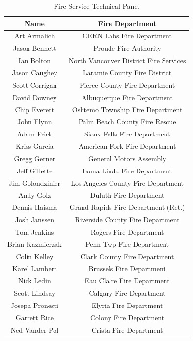 \documentclass{article}
\begin{document}
\begin{table}[H]
	\centering
	\caption{Fire Service Technical Panel}
	\begin{tabular}{|c|c|}
		\hline
		\bf{Name} & \bf{Fire Department} \\ \hline \hline
		Art Armalich & CERN Labs Fire Department \\ \hline
		Jason Bennett & Proude Fire Authority \\ \hline
		Ian Bolton & North Vancouver District Fire Services \\ \hline
		Jason Caughey & Laramie County Fire District \\ \hline
		Scott Corrigan & Pierce County Fire Department \\ \hline
		David Downey & Albuquerque Fire Department \\ \hline
		Chip Everett & Oshtemo Township Fire Department \\ \hline
		John Flynn & Palm Beach County Fire Rescue \\ \hline
		Adam Frick & Sioux Falls Fire Department \\ \hline
		Kriss Garcia & American Fork Fire Department \\ \hline
		Gregg Gerner & General Motors Assembly \\ \hline
		Jeff Gillette & Loma Linda Fire Department \\ \hline
		Jim Golondzinier & Los Angeles County Fire Department \\ \hline
		Andy Golz & Duluth Fire Department \\ \hline
		Dennis Haisma & Grand Rapids Fire Department (Ret.) \\ \hline
		Josh Janssen & Riverside County Fire Department \\ \hline
		Tom Jenkins & Rogers Fire Department \\ \hline
		Brian Kazmierzak & Penn Twp Fire Department \\ \hline
		Colin Kelley & Clark County Fire Department \\ \hline
		Karel Lambert & Brussels Fire Department \\ \hline
		Nick Ledin & Eau Claire Fire Department \\ \hline
		Scott Lindsay & Calgary Fire Department \\ \hline
		Joseph Pronesti & Elyria Fire Department \\ \hline
		Garrett Rice & Colony Fire Department \\ \hline
		Ned Vander Pol & Crista Fire Department \\ \hline
	\end{tabular}
	\label{tab:TechPanelList}
\end{table}
\end{document}
